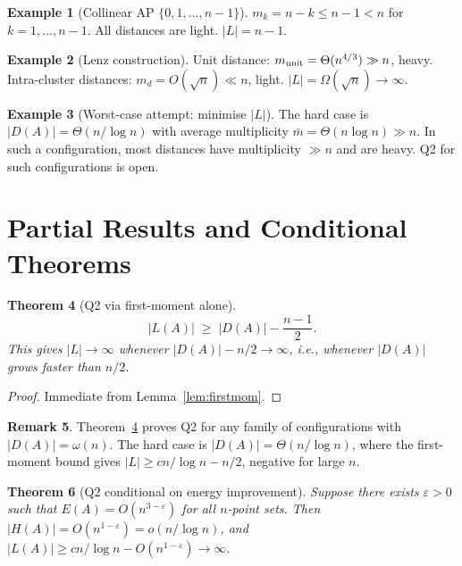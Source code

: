\documentclass[12pt,a4paper]{amsart}
\def\cL{\textit{L}}\def\cH{\textit{H}}%
\theoremstyle{plain}
\newtheorem{theorem}{Theorem}[section]
\theoremstyle{definition}
\newtheorem{example}[theorem]{Example}
\newtheorem{remark}[theorem]{Remark}
\newcommand{\cL}{\mathcal{L}}
\newcommand{\cH}{\mathcal{H}}
\begin{document}
\begin{example}[Collinear AP $\{0,1,\ldots,n-1\}$]
$m_k=n-k\le n-1<n$ for $k=1,\ldots,n-1$.  All distances are light.
$|\cL|=n-1$.
\end{example}

\begin{example}[Lenz construction]
Unit distance: $m_{\rm unit}=\Theta(n^{4/3})\gg n$, heavy.
Intra-cluster distances: $m_d=O(\sqrt{n})\ll n$, light.
$|\cL|=\Omega(\sqrt{n})\to\infty$.
\end{example}

\begin{example}[Worst-case attempt: minimise $|\cL|$]
The hard case is $|D(A)|=\Theta(n/\log n)$ with average multiplicity
$\bar{m}=\Theta(n\log n)\gg n$.  In such a configuration, most
distances have multiplicity $\gg n$ and are heavy.  Q2 for such
configurations is open.
\end{example}

\section{Partial Results and Conditional Theorems}
\label{sec:partial}

\begin{theorem}[Q2 via first-moment alone]
\label{thm:partial_firstmom}
\[
  |\cL(A)| \;\ge\; |D(A)| - \frac{n-1}{2}.
\]
This gives $|\cL|\to\infty$ whenever $|D(A)| - n/2\to\infty$, i.e.,
whenever $|D(A)|$ grows faster than $n/2$.
\end{theorem}

\begin{proof}
Immediate from Lemma~\ref{lem:firstmom}.
\end{proof}

\begin{remark}
Theorem~\ref{thm:partial_firstmom} proves Q2 for any family of
configurations with $|D(A)|=\omega(n)$.  The hard case is
$|D(A)|=\Theta(n/\log n)$, where the first-moment bound gives
$|\cL|\ge cn/\log n - n/2$, negative for large $n$.
\end{remark}

\begin{theorem}[Q2 conditional on energy improvement]
\label{thm:conditional_energy}
Suppose there exists $\varepsilon>0$ such that
$E(A)=O(n^{3-\varepsilon})$ for all $n$-point sets.
Then $|\cH(A)|=O(n^{1-\varepsilon})=o(n/\log n)$, and
$|\cL(A)|\ge cn/\log n - O(n^{1-\varepsilon})\to\infty$.
\end{theorem}
\end{document}
